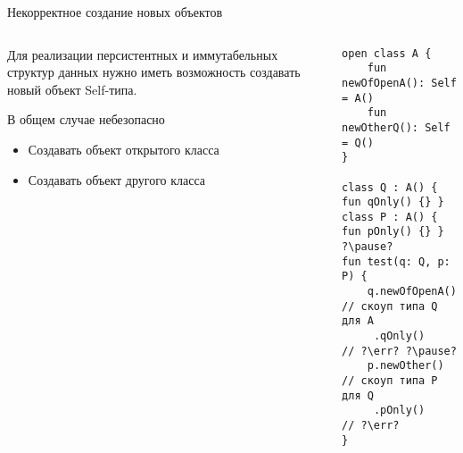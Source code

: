 \documentclass[aspectratio=169,usenames,dvipsnames]{beamer}
\newcommand{\err}[0]{\textcolor{red}{ошибка}}
\begin{document}
    \begin{frame}[fragile]{Некорректное создание новых объектов}
        \begin{columns}[onlytextwidth]
            \begin{column}[t]{0.46\textwidth}
                \vspace{0.5em}

                Для реализации персистентных и иммутабельных структур данных нужно иметь возможность создавать новый объект Self-типа.

                \vspace{1em}
                \begin{block}{В общем случае небезопасно}
                    \begin{itemize}
                        \item Создавать объект открытого класса
                        \item Создавать объект другого класса
                    \end{itemize}
                \end{block}
            \end{column}\hfill%
            \begin{column}[t]{0.50\textwidth}
                \pause
                \begin{verbatim}
open class A {
    fun newOfOpenA(): Self = A()
    fun newOtherQ(): Self = Q()
}

class Q : A() { fun qOnly() {} }
class P : A() { fun pOnly() {} }
?\pause?
fun test(q: Q, p: P) {
    q.newOfOpenA() // скоуп типа Q для A
     .qOnly()      // ?\err? ?\pause?
    p.newOther()   // скоуп типа P для Q
     .pOnly()      // ?\err?
}
                \end{verbatim}
            \end{column}
        \end{columns}
    \end{frame}
\end{document}
